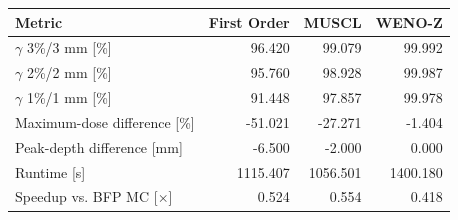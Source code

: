 \begin{tabular}{lrrr}
\toprule
Metric & First Order & MUSCL & WENO-Z \\
\midrule
$\gamma$ 3\%/3 mm [\%] & 96.420 & 99.079 & 99.992 \\
$\gamma$ 2\%/2 mm [\%] & 95.760 & 98.928 & 99.987 \\
$\gamma$ 1\%/1 mm [\%] & 91.448 & 97.857 & 99.978 \\
Maximum-dose difference [\%] & -51.021 & -27.271 & -1.404 \\
Peak-depth difference [mm] & -6.500 & -2.000 & 0.000 \\
Runtime [s] & 1115.407 & 1056.501 & 1400.180 \\
Speedup vs. BFP MC [$\times$] & 0.524 & 0.554 & 0.418 \\
\bottomrule
\end{tabular}
